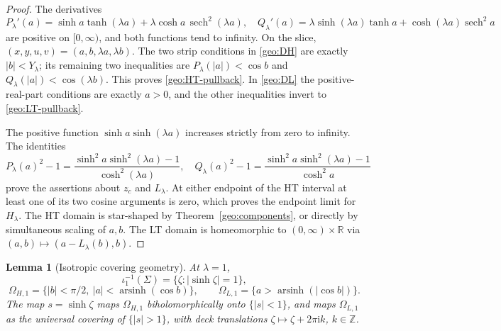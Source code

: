 \documentclass[11pt]{article}
\numberwithin{equation}{section}
\newtheorem{lemma}[theorem]{Lemma}
\theoremstyle{definition}
\newcommand{\R}{\mathbb R}
\newcommand{\Z}{\mathbb Z}
\newcommand{\ii}{\mathrm i}
\begin{document}
\begin{proof}
The derivatives
\[
 P_\lambda'(a)=\sinh a\tanh(\lambda a)
              +\lambda\cosh a\,\operatorname{sech}^2(\lambda a),
\quad
 Q_\lambda'(a)=\lambda\sinh(\lambda a)\tanh a
              +\cosh(\lambda a)\operatorname{sech}^2a
\]
are positive on \([0,\infty)\), and both functions tend to
infinity.  On the slice,
\((x,y,u,v)=(a,b,\lambda a,\lambda b)\).
The two strip conditions in \eqref{geo:DH} are exactly
\(|b|<Y_\lambda\); its remaining two inequalities are
\(P_\lambda(|a|)<\cos b\) and
\(Q_\lambda(|a|)<\cos(\lambda b)\).
This proves \eqref{geo:HT-pullback}.
In \eqref{geo:DL} the positive-real-part conditions are
exactly \(a>0\), and the other inequalities invert to
\eqref{geo:LT-pullback}.

The positive function \(\sinh a\sinh(\lambda a)\) increases
strictly from zero to infinity.  The identities
\[
 P_\lambda(a)^2-1
 =\frac{\sinh^2a\sinh^2(\lambda a)-1}{\cosh^2(\lambda a)},
\quad
 Q_\lambda(a)^2-1
 =\frac{\sinh^2a\sinh^2(\lambda a)-1}{\cosh^2a}
\]
prove the assertions about \(z_c\) and \(L_\lambda\).
At either endpoint of the HT interval at least one of its
two cosine arguments is zero, which proves the endpoint
limit for \(H_\lambda\).
The HT domain is star-shaped by Theorem~\ref{geo:components},
or directly by simultaneous scaling of \(a,b\).
The LT domain is homeomorphic to
\((0,\infty)\times\R\) via
\((a,b)\mapsto(a-L_\lambda(b),b)\).
\end{proof}

\begin{lemma}[Isotropic covering geometry]\label{geo:isotropic-cover}
At \(\lambda=1\),
\[
 \iota_1^{-1}(\Sigma)=\{\zeta:|\sinh\zeta|=1\},
\]
\[
 \Omega_{H,1}
 =\{|b|<\pi/2,\ |a|<\operatorname{arsinh}(\cos b)\},
\qquad
 \Omega_{L,1}
 =\{a>\operatorname{arsinh}(|\cos b|)\}.
\]
The map \(s=\sinh\zeta\) maps \(\Omega_{H,1}\)
biholomorphically onto \(\{|s|<1\}\), and maps
\(\Omega_{L,1}\) as the universal covering of
\(\{|s|>1\}\), with deck translations
\(\zeta\mapsto\zeta+2\pi\ii k\), \(k\in\Z\).
\end{lemma}
\end{document}
